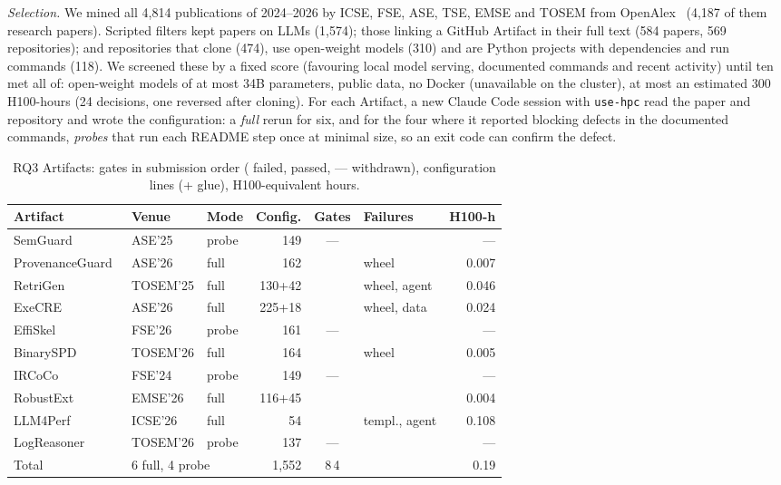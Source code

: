 \documentclass[10pt,conference]{IEEEtran}
\newcommand{\cmark}{\ding{51}}
\newcommand{\xmark}{\ding{55}}
\newcommand{\tool}{\texttt{use-hpc}}
\begin{document}
\emph{Selection.} We mined all 4{,}814 publications of 2024--2026 by ICSE, FSE, ASE, TSE, EMSE and TOSEM from OpenAlex~\cite{priem2022openalex} (4{,}187 of them research papers). Scripted filters kept papers on LLMs (1{,}574); those linking a GitHub Artifact in their full text (584 papers, 569 repositories); and repositories that clone (474), use open-weight models (310) and are Python projects with dependencies and run commands (118). We screened these by a fixed score (favouring local model serving, documented commands and recent activity) until ten met all of: open-weight models of at most 34B parameters, public data, no Docker (unavailable on the cluster), at most an estimated 300 H100-hours (24 decisions, one reversed after cloning). For each Artifact, a new Claude Code session with \tool{} read the paper and repository and wrote the configuration: a \emph{full} rerun for six, and for the four where it reported blocking defects in the documented commands, \emph{probes} that run each README step once at minimal size, so an exit code can confirm the defect.



\begin{table}[t]
\centering\scriptsize
\caption{RQ3 Artifacts: gates in submission order (\xmark{} failed, \cmark{} passed, --- withdrawn), configuration lines (+ glue), H100-equivalent hours.}
\label{tab:study}
\setlength{\tabcolsep}{1.9pt}
\begin{tabular}{@{}l l l r c l r@{}}
\toprule
Artifact & Venue & Mode & Config. & Gates & Failures & H100-h \\
\midrule
SemGuard~\cite{wang2025semguard} & ASE'25 & probe & 149 & --- & & --- \\
ProvenanceGuard~\cite{she2026provenanceguard} & ASE'26 & full & 162 & \xmark\cmark & wheel & 0.007 \\
RetriGen~\cite{zhang2025retrigen} & TOSEM'25 & full & 130+42 & \xmark\xmark & wheel, agent & 0.046 \\
ExeCRE~\cite{dong2026execre} & ASE'26 & full & 225+18 & \xmark\xmark\cmark & wheel, data & 0.024 \\
EffiSkel~\cite{yu2026effiskel} & FSE'26 & probe & 161 & --- & & --- \\
BinarySPD~\cite{li2026binaryspd} & TOSEM'26 & full & 164 & \xmark\cmark & wheel & 0.005 \\
IRCoCo~\cite{li2024ircoco} & FSE'24 & probe & 149 & --- & & --- \\
RobustExt~\cite{rabbi2026robustness} & EMSE'26 & full & 116+45 & \cmark & & 0.004 \\
LLM4Perf~\cite{wang2026llm4perf} & ICSE'26 & full & 54 & \xmark\xmark & templ., agent & 0.108 \\
LogReasoner~\cite{ma2026logreasoner} & TOSEM'26 & probe & 137 & --- & & --- \\
\midrule
Total & \multicolumn{2}{l}{6 full, 4 probe} & 1{,}552 & 8\xmark\,4\cmark & & 0.19 \\
\bottomrule
\end{tabular}
\end{table}
\end{document}
